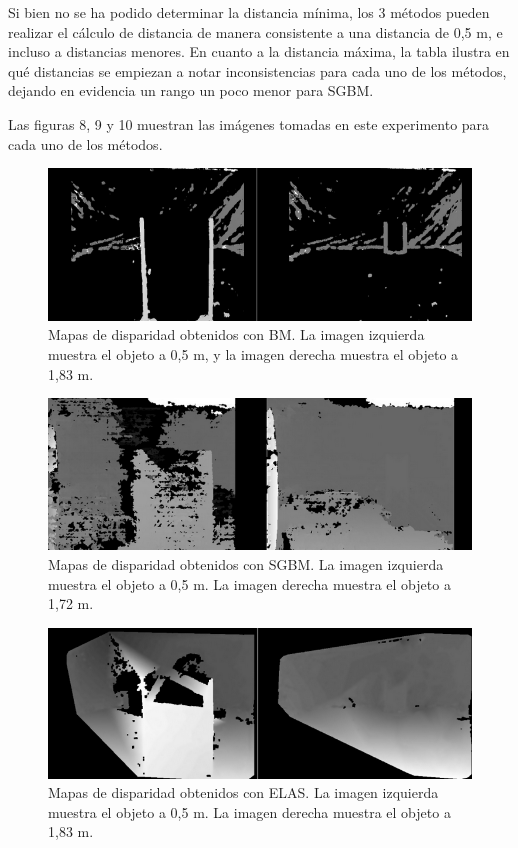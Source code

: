 \documentclass[11pt,a4paper,titlepage]{article}
\begin{document}
Si bien no se ha podido determinar la distancia mínima, los 3 métodos pueden realizar el cálculo de distancia de manera consistente a una distancia de 0,5 m, e incluso a distancias menores. En cuanto a la distancia máxima, la tabla ilustra en qué distancias se empiezan a notar inconsistencias para cada uno de los métodos, dejando en evidencia un rango un poco menor para SGBM.

Las figuras 8, 9 y 10 muestran las imágenes tomadas en este experimento para cada uno de los métodos.

\begin{figure}[h!]

  \centering
    \includegraphics[width=1\textwidth]{f8.png}
  \caption{Mapas de disparidad obtenidos con BM. La imagen izquierda muestra el objeto a 0,5 m, y la imagen derecha muestra el objeto a 1,83 m.}
\end{figure}

\begin{figure}[h!]

  \centering
    \includegraphics[width=1\textwidth]{f9.png}
  \caption{Mapas de disparidad obtenidos con SGBM. La imagen izquierda muestra el objeto a 0,5 m. La imagen derecha muestra el objeto a 1,72 m.}
\end{figure}

\begin{figure}[h!]

  \centering
    \includegraphics[width=1\textwidth]{f10.png}
  \caption{Mapas de disparidad obtenidos con ELAS. La imagen izquierda muestra el objeto a 0,5 m. La imagen derecha muestra el objeto a 1,83 m.}
\end{figure}
\end{document}
